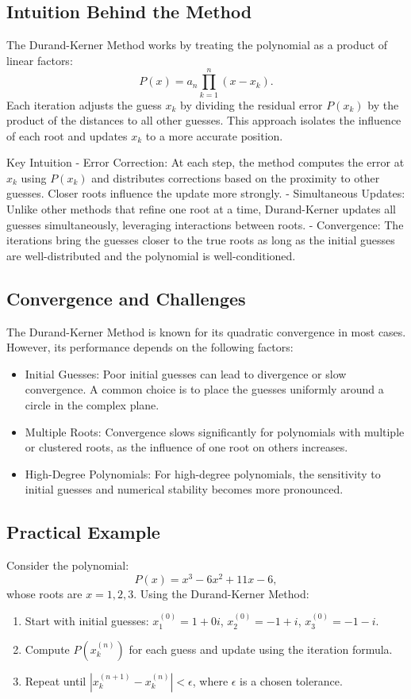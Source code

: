 \documentclass[10pt]{IEEEtran}
\begin{document}
\subsection{Intuition Behind the Method}
The Durand-Kerner Method works by treating the polynomial as a product of linear factors:
\begin{equation}
    P(x) = a_n \prod_{k=1}^n (x - x_k).
\end{equation}
Each iteration adjusts the guess $x_k$ by dividing the residual error $P(x_k)$ by the product of the distances to all other guesses. This approach isolates the influence of each root and updates $x_k$ to a more accurate position.

Key Intuition
- Error Correction: At each step, the method computes the error at $x_k$ using $P(x_k)$ and distributes corrections based on the proximity to other guesses. Closer roots influence the update more strongly.
- Simultaneous Updates: Unlike other methods that refine one root at a time, Durand-Kerner updates all guesses simultaneously, leveraging interactions between roots.
- Convergence: The iterations bring the guesses closer to the true roots as long as the initial guesses are well-distributed and the polynomial is well-conditioned.

\subsection{Convergence and Challenges}
The Durand-Kerner Method is known for its quadratic convergence in most cases. However, its performance depends on the following factors:
\begin{itemize}
    \item Initial Guesses: Poor initial guesses can lead to divergence or slow convergence. A common choice is to place the guesses uniformly around a circle in the complex plane.
    \item Multiple Roots: Convergence slows significantly for polynomials with multiple or clustered roots, as the influence of one root on others increases.
    \item High-Degree Polynomials: For high-degree polynomials, the sensitivity to initial guesses and numerical stability becomes more pronounced.
\end{itemize}

\subsection{Practical Example}
Consider the polynomial:
\begin{equation}
    P(x) = x^3 - 6x^2 + 11x - 6,
\end{equation}
whose roots are $x = 1, 2, 3$. Using the Durand-Kerner Method:
\begin{enumerate}
    \item Start with initial guesses: $x_1^{(0)} = 1 + 0i$, $x_2^{(0)} = -1 + i$, $x_3^{(0)} = -1 - i$.
    \item Compute $P(x_k^{(n)})$ for each guess and update using the iteration formula.
    \item Repeat until $|x_k^{(n+1)} - x_k^{(n)}| < \epsilon$, where $\epsilon$ is a chosen tolerance.
\end{enumerate}
\end{document}
